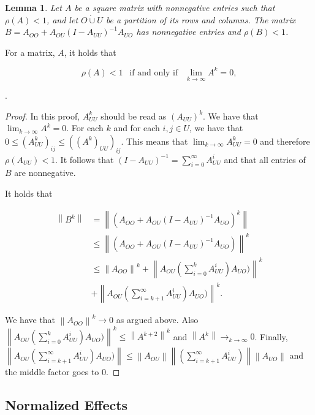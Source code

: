\documentclass[accepted]{uai2021} %
\newtheorem{lem}[thm]{Lemma}
\newcommand{\disjU}{\mathbin{\dot{\cup}}}
\newcommand{\norm}[1]{\left\lVert#1\right\rVert}
\begin{document}
\begin{lem}
	Let $A$ be a square matrix with nonnegative entries such that $\rho(A)<1$, 
	and let $O\disjU U$ be a partition of its rows and columns. The matrix 
	$B=A_{OO} + 
	A_{OU}(I-A_{UU})^{-1}A_{UO}$ has nonnegative entries and  
	$\rho(B)<1$.
	\label{lem:margStab}
	\end{lem}
	
	For a matrix, $A$, it holds that
	
	$$
	\rho(A) < 1 \ \  \text{   if and only if   } \ \ \lim_{k\rightarrow \infty} 
	A^k = 0,
	$$
	
	\citep[Theorem 5.6.12]{horn1985}.
	
	\begin{proof}
		In this proof, $A_{UU}^k$ should be read as $(A_{UU})^k$.
		We have that $\lim_{k\rightarrow\infty} A^k = 0$. For each $k$ and for 
		each $i,j\in U$, we have that $0 \leq (A_{UU}^k)_{ij} \leq 
		((A^k)_{UU})_{ij}$. This means that $\lim_{k\rightarrow\infty} A_{UU}^k 
		= 0$ and therefore $\rho(A_{UU}) < 1$. It follows that 
		$(I-A_{UU})^{-1} = \sum_{i=0}^\infty A_{UU}^i$ and that all entries of 
		$B$ are nonnegative.
		
		It holds that
		
		\begin{align*}
		\norm{B^k} &= \norm{(A_{OO} + 
			A_{OU}(I - A_{UU})^{-1}A_{UO})^k} \\
			&\leq \norm{(A_{OO} + 
				A_{OU}(I - A_{UU})^{-1}A_{UO})}^k \\
				&\leq \norm{A_{OO}}^k + \norm{ 
					A_{OU}(\sum_{i=0}^k A_{UU}^i) A_{UO})}^k \\ &+ \norm{
					A_{OU}(\sum_{i=k+1}^\infty A_{UU}^i)A_{UO})}^k.
					\end{align*}
					
					\noindent We have that $\norm{A_{OO}}^k \rightarrow 0$ as 
					argued above. Also 
					$\norm{ 
						A_{OU}(\sum_{i=0}^k A_{UU}^i) A_{UO})}^k \leq \norm{ 
						A^{k+2}}^k $ and $\norm{ 
						A^k} \rightarrow_{k\rightarrow \infty} 0$. Finally, 
						$\norm{
						A_{OU}(\sum_{i=k+1}^\infty A_{UU}^i)A_{UO})} \leq \norm{
						A_{OU}}\norm{(\sum_{i=k+1}^\infty 
						A_{UU}^i)}\norm{A_{UO}}$ and the 
						middle factor goes to 0.
						
						
						
						
						\end{proof}
						
		

\subsection{Normalized Effects}
\label{sssec:normEff}
\end{document}
